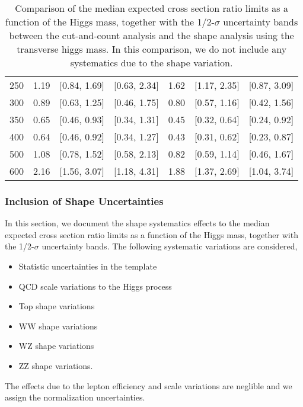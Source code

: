 \begin{table}[!ht]
\begin{center}
{\begin{tabular}{|l|c|c|c|c|c|c|}
\hline
250 & 1.19 & [0.84, 1.69] & [0.63, 2.34] & 1.62 & [1.17, 2.35] & [0.87, 3.09] \\
300 & 0.89 & [0.63, 1.25] & [0.46, 1.75] & 0.80 & [0.57, 1.16] & [0.42, 1.56] \\
350 & 0.65 & [0.46, 0.93] & [0.34, 1.31] & 0.45 & [0.32, 0.64] & [0.24, 0.92] \\
400 & 0.64 & [0.46, 0.92] & [0.34, 1.27] & 0.43 & [0.31, 0.62] & [0.23, 0.87]\\
500 & 1.08 & [0.78, 1.52] & [0.58, 2.13] & 0.82 & [0.59, 1.14] & [0.46, 1.67] \\
600 & 2.16 & [1.56, 3.07] & [1.18, 4.31] & 1.88 & [1.37, 2.69] & [1.04, 3.74]\\
\hline
\end{tabular}
}
\caption{ 
Comparison of the median expected cross section ratio limits as a function 
of the Higgs mass, together with the 1/2-$\sigma$ uncertainty bands between the cut-and-count 
analysis and the shape analysis using the transverse higgs mass. 
In this comparison, we do not include any systematics due to the shape variation. }
\label{tab:mvashape_mevsbdt_hzz}
\end{center}
\end{table}

\subsubsection{Inclusion of Shape Uncertainties}

In this section, we document the shape systematics effects to the median expected cross section 
ratio limits as a function of the Higgs mass, together with the 1/2-$\sigma$ uncertainty bands. 
The following systematic variations are considered,
\begin{itemize}
\item {Statistic uncertainties in the template}
\item {QCD scale variations to the Higgs process}
\item {Top shape variations}
\item {WW shape variations}
\item {WZ shape variations}
\item {ZZ shape variations}.
\end{itemize}
The effects due to the lepton efficiency and scale variations are neglible and we assign 
the normalization uncertainties. 

